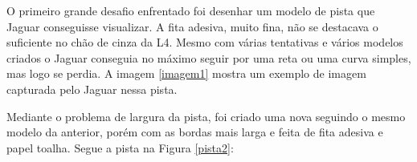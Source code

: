 O primeiro grande desafio enfrentado foi desenhar um modelo de pista que Jaguar conseguisse visualizar. A fita adesiva, muito fina, não se destacava o suficiente no chão de cinza da L4. Mesmo com várias tentativas e vários modelos criados o Jaguar conseguia no máximo seguir por uma reta ou uma curva simples, mas logo se perdia. A imagem \ref{imagem1} mostra um exemplo de imagem capturada pelo Jaguar nessa pista.

	\begin{figure}[H]
		\centering
\end{figure}


Mediante o problema de largura da pista, foi criado uma nova seguindo o mesmo modelo da anterior, porém com as bordas mais larga e feita de fita adesiva e papel toalha. Segue a pista na Figura \ref{pista2}:

	\begin{figure}[H]
		\centering
\end{figure}


